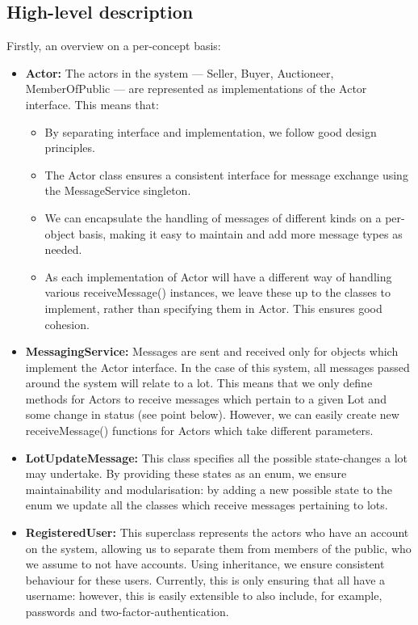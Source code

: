 \documentclass[titlepage, 12pt]{extarticle}
\begin{document}
\subsection{High-level description}
\noindent Firstly, an overview on a per-concept basis:
\begin{itemize}
\item {\bf Actor: } The actors in the system --- Seller, Buyer, Auctioneer, MemberOfPublic --- are represented as implementations of the Actor interface. This means that:
  \begin{itemize}
  \item By separating interface and implementation, we follow good design principles.
  \item The Actor class ensures a consistent interface for message exchange using the MessageService singleton.
  \item We can encapsulate the handling of messages of different kinds on a per-object basis, making it easy to maintain and add more message types as needed.
  \item As each implementation of Actor will have a different way of handling various receiveMessage() instances, we leave these up to the classes to implement, rather than specifying them in Actor. This ensures good cohesion. 
  \end{itemize}
\item {\bf MessagingService: } Messages are sent and received only for objects which implement the Actor interface. In the case of this system, all messages passed around the system will relate to a lot. This means that we only define methods for Actors to receive messages which pertain to a given Lot and some change in status (see point below). However, we can easily create new receiveMessage() functions for Actors which take different parameters. 
\item {\bf LotUpdateMessage: } This class specifies all the possible state-changes a lot may undertake. By providing these states as an enum, we ensure maintainability and modularisation: by adding a new possible state to the enum we update all the classes which receive messages pertaining to lots.
\item {\bf RegisteredUser: } This superclass represents the actors who have an account on the system, allowing us to separate them from members of the public, who we assume to not have accounts. Using inheritance, we ensure consistent behaviour for these users. Currently, this is only ensuring that all have a username: however, this is easily extensible to also include, for example, passwords and two-factor-authentication.

\end{itemize}
\end{document}
